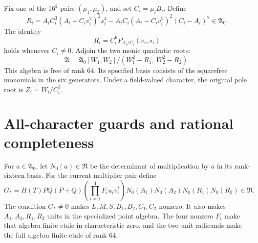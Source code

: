 \documentclass[11pt,a4paper]{article}
\begin{document}
Fix one of the \(16^2\) pairs \((\mu_1,\mu_2)\), and set
\(C_i=\mu_iB_i\). Define
\begin{equation}\label{eq:radicands}
 R_i=A_iC_i^3(A_i+C_iv_i^2)^2s_i^4
       -A_iC_i(A_i-C_iv_i^2)^2(C_i-A_i)^2\in\mathfrak A_0.
\end{equation}
The identity
\[
                     R_i=C_i^6P_{A_i/C_i}(v_i,s_i)
\]
holds whenever \(C_i\ne0\). Adjoin the two monic quadratic roots:
\[
 \mathfrak A=\mathfrak A_0[W_1,W_2]/(W_1^2-R_1,\ W_2^2-R_2).
\]
This algebra is free of rank \(64\). Its specified basis consists of
the squarefree monomials in the six generators. Under a field-valued
character, the original pole root is \(Z_i=W_i/C_i^3\).

\section{All-character guards and rational completeness}

For \(a\in\mathfrak A_0\), let \(N_0(a)\in\mathfrak R\) be the determinant
of multiplication by \(a\) in its rank-sixteen basis. For the current
multiplier pair define
\begin{equation}\label{eq:guard}
 G_*=
 H(T)P Q(P+Q)\!
 \left(\prod_{i=1}^4F_i u_i v_i^*\right)
 N_0(A_1)N_0(A_2)N_0(R_1)N_0(R_2)\in\mathfrak R.
\end{equation}
The condition \(G_*\ne0\) makes \(L,M,S,B_1,B_2,C_1,C_2\) nonzero.
It also makes \(A_1,A_2,R_1,R_2\) units in the specialized point
algebra. The four nonzero \(F_i\) make that algebra finite etale in
characteristic zero, and the two unit radicands make the full algebra
finite etale of rank \(64\).
\end{document}
